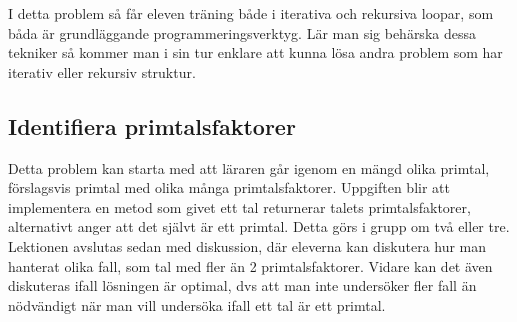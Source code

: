     \textcolor{WildStrawberry}{
        I detta problem så får eleven träning både i iterativa och rekursiva loopar, som båda  är grundläggande programmeringsverktyg. Lär man sig behärska dessa tekniker så kommer man i sin tur enklare att kunna lösa andra problem som har iterativ eller rekursiv struktur.}

%    
%    
    
\subsection{Identifiera primtalsfaktorer}
    \label{sec:primtal}
    
    \textcolor{WildStrawberry}{
        Detta problem kan starta med att läraren går igenom en mängd olika primtal, förslagsvis primtal med olika många primtalsfaktorer. Uppgiften blir att implementera en metod som givet ett tal returnerar talets primtalsfaktorer, alternativt anger att det självt är ett primtal. Detta görs i grupp om två eller tre. Lektionen avslutas sedan med diskussion, där eleverna kan diskutera hur man hanterat olika fall, som tal med fler än 2 primtalsfaktorer. Vidare kan det även diskuteras ifall lösningen är optimal, dvs att man inte undersöker fler fall än nödvändigt när man vill undersöka ifall ett tal är ett primtal.
        }
        
